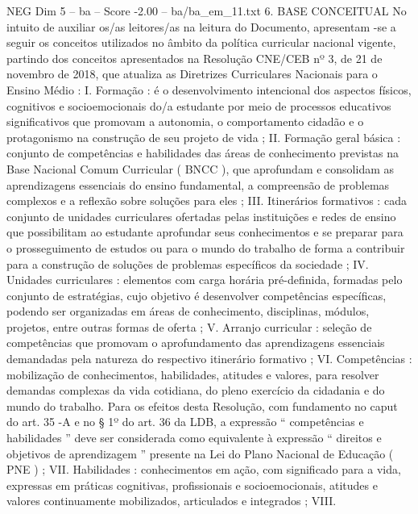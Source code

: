 \begin{textsample}{NEG Dim 5 – ba – Score -2.00 – ba/ba\_em\_11.txt}  \label{ex:f5_neg_014}
6.
BASE CONCEITUAL No intuito de auxiliar os/as leitores/as na leitura do Documento, apresentam -se a seguir os conceitos utilizados no âmbito da política curricular nacional vigente, partindo dos conceitos apresentados na Resolução CNE/CEB nº 3, de 21 de novembro de 2018, que atualiza as Diretrizes Curriculares Nacionais para o Ensino Médio : I.
Formação : é o desenvolvimento intencional dos aspectos físicos, cognitivos e socioemocionais do/a estudante por meio de processos educativos significativos que promovam a autonomia, o comportamento cidadão e o protagonismo na construção de seu projeto de vida ; II.
Formação geral básica : conjunto de competências e habilidades das áreas de conhecimento previstas na Base Nacional Comum Curricular ( BNCC ), que aprofundam e consolidam as aprendizagens essenciais do ensino fundamental, a compreensão de problemas complexos e a reflexão sobre soluções para eles ; III.
Itinerários formativos : cada conjunto de unidades curriculares ofertadas pelas instituições e redes de ensino que possibilitam ao estudante aprofundar seus conhecimentos e se preparar para o prosseguimento de estudos ou para o mundo do trabalho de forma a contribuir para a construção de soluções de problemas específicos da sociedade ; IV.
Unidades curriculares : elementos com carga horária pré-definida, formadas pelo conjunto de estratégias, cujo objetivo é desenvolver competências específicas, podendo ser organizadas em áreas de conhecimento, disciplinas, módulos, projetos, entre outras formas de oferta ; V.
Arranjo curricular : seleção de competências que promovam o aprofundamento das aprendizagens essenciais demandadas pela natureza do respectivo itinerário formativo ; VI.
Competências : mobilização de conhecimentos, habilidades, atitudes e valores, para resolver demandas complexas da vida cotidiana, do pleno exercício da cidadania e do mundo do trabalho.
Para os efeitos desta Resolução, com fundamento no caput do art. 35 -A e no § 1º do art. 36 da LDB, a expressão “ competências e habilidades ” deve ser considerada como equivalente à expressão “ direitos e objetivos de aprendizagem ” presente na Lei do Plano Nacional de Educação ( PNE ) ; VII.
Habilidades : conhecimentos em ação, com significado para a vida, expressas em práticas cognitivas, profissionais e socioemocionais, atitudes e valores continuamente mobilizados, articulados e integrados ; VIII.

\end{textsample}
